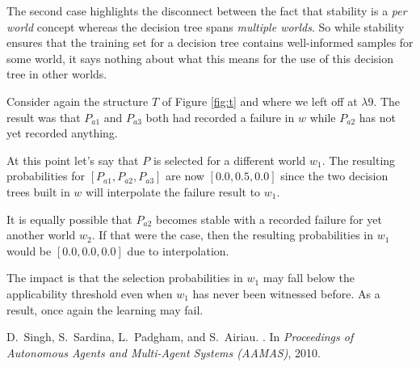 \documentclass[a4paper]{article}
\begin{document}
The second case highlights the disconnect between the fact that stability is a \textit{per world} concept whereas the decision tree spans \textit{multiple worlds}. So while stability ensures that the training set for a decision tree contains well-informed samples for some world, it says nothing about what this means for the use of this decision tree in other worlds.

Consider again the structure $T$ of Figure \ref{fig:t} and where we left off at $\lambda9$. The result was that $P_{a1}$ and $P_{a3}$ both had recorded a failure in $w$ while $P_{a2}$ has not yet recorded anything.

At this point let's say that $P$ is selected for a different world $w_1$. The resulting probabilities for $[P_{a1},P_{a2},P_{a3}]$ are now $[0.0,0.5,0.0]$ since the two decision trees built in $w$ will interpolate the failure result to $w_1$.

It is equally possible that $P_{a2}$ becomes stable with a recorded failure for yet another world $w_2$. If that were the case, then the resulting probabilities in $w_1$ would be $[0.0,0.0,0.0]$ due to interpolation. 

The impact is that the selection probabilities in $w_1$ may fall below the applicability threshold even when $w_1$ has never been witnessed before. As a result, once again the learning may fail.

\begin{thebibliography}{10}

D.~Singh, S.~Sardina, L.~Padgham, and S.~Airiau.
.
\newblock In \emph{Proceedings of Autonomous Agents and Multi-Agent Systems
  (AAMAS)}, 2010.

\end{thebibliography}
\end{document}
